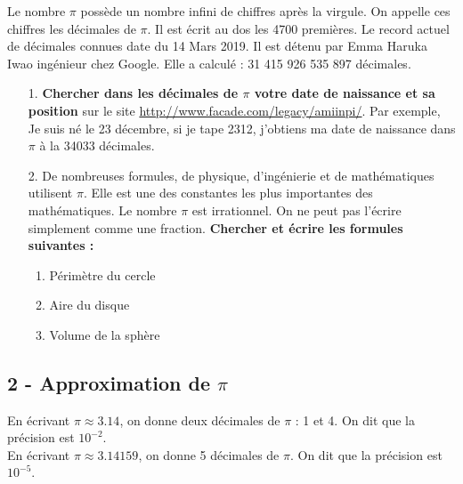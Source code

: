 \documentclass[11pt]{article}
\begin{document}
Le nombre $\pi$ possède un nombre infini de chiffres après la virgule. On appelle ces chiffres les décimales de $\pi$. Il est écrit au dos les 4700 premières. Le record actuel de décimales connues date du 14 Mars 2019. Il est détenu par Emma Haruka Iwao ingénieur chez Google. Elle a calculé : 31 415 926 535 897 décimales.

\begin{enumerate}
\item[1.] \textbf{Chercher dans les décimales de $\pi$ votre date de naissance et sa position} sur le site \url{http://www.facade.com/legacy/amiinpi/}. Par exemple, Je suis né le 23 décembre, si je tape 2312, j'obtiens ma date de naissance dans $\pi$ à la 34033 décimales.

\item[2.] De nombreuses formules, de physique, d’ingénierie et de mathématiques utilisent $\pi$. Elle est une des constantes les plus importantes des mathématiques. Le nombre $\pi$ est irrationnel. On ne peut pas l'écrire simplement comme une fraction. \textbf{Chercher et écrire les formules suivantes :} 

  \begin{multicols}{3}
  \begin{enumerate}
  \item Périmètre du cercle
  \item Aire du disque
  \item Volume de la sphère 
  \end{enumerate}
  \end{multicols}

\end{enumerate}

\vspace{-0.4cm}
\subsection*{2 - Approximation de $\pi$}

En écrivant $\pi \approx 3.14$, on donne deux décimales de $\pi$ : 1 et 4. On dit que la précision est $10^{-2}$.\\
En écrivant $\pi \approx 3.14159$, on donne 5 décimales de $\pi$. On dit que la précision est $10^{-5}$.
\end{document}
